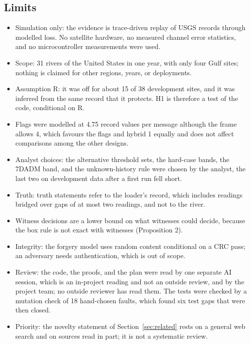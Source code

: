 \subsection{Limits}
\begin{itemize}
  \item Simulation only: the evidence is trace-driven replay of USGS records through modelled loss. No satellite hardware, no measured channel error statistics, and no microcontroller measurements were used.
  \item Scope: 31 rivers of the United States in one year, with only four Gulf sites; nothing is claimed for other regions, years, or deployments.
  \item Assumption R: it was off for about 15 of 38 development sites, and it was inferred from the same record that it protects. H1 is therefore a test of the code, conditional on R.
  \item Flags were modelled at 4.75 record values per message although the frame allows 4, which favours the flags and hybrid 1 equally and does not affect comparisons among the other designs.
  \item Analyst choices: the alternative threshold sets, the hard-case bands, the 7DADM band, and the unknown-history rule were chosen by the analyst, the last two on development data after a first run fell short.
  \item Truth: truth statements refer to the loader's record, which includes readings bridged over gaps of at most two readings, and not to the river.
  \item Witness decisions are a lower bound on what witnesses could decide, because the box rule is not exact with witnesses (Proposition 2).
  \item Integrity: the forgery model uses random content conditional on a CRC pass; an adversary needs authentication, which is out of scope.
  \item Review: the code, the proofs, and the plan were read by one separate AI session, which is an in-project reading and not an outside review, and by the project team; no outside reviewer has read them. The tests were checked by a mutation check of 18 hand-chosen faults, which found six test gaps that were then closed.
  \item Priority: the novelty statement of Section~\ref{sec:related} rests on a general web search and on sources read in part; it is not a systematic review.
\end{itemize}
